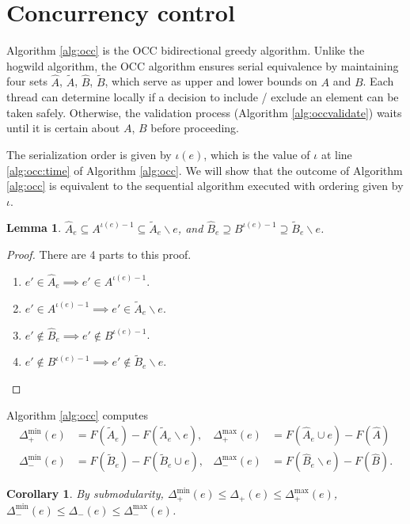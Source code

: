 \documentclass{article} %
\newtheorem{cor}[thm]{Corollary}
\newtheorem{lem}[thm]{Lemma}
\begin{document}
\section{Concurrency control}

Algorithm \ref{alg:occ} is the OCC bidirectional greedy algorithm.
Unlike the hogwild algorithm, the OCC algorithm ensures serial equivalence by maintaining four sets $\hat{A}$, $\tilde{A}$, $\hat{B}$, $\tilde{B}$, which serve as upper and lower bounds on $A$ and $B$.
Each thread can determine locally if a decision to include / exclude an element can be taken safely.
Otherwise, the validation process (Algorithm \ref{alg:occvalidate}) waits until it is certain about $A$, $B$ before proceeding.

The serialization order is given by $\iota(e)$, which is the value of $\iota$ at line \ref{alg:occ:time} of Algorithm \ref{alg:occ}.
We will show that the outcome of Algorithm \ref{alg:occ} is equivalent to the sequential algorithm executed with ordering given by $\iota$.

\begin{lem} $\hat{A}_e \subseteq A^{\iota(e)-1} \subseteq \tilde{A}_e \backslash e$, and $\hat{B}_e \supseteq B^{\iota(e)-1} \supseteq \tilde{B}_e \backslash e$.
\end{lem}
\begin{proof}
There are 4 parts to this proof.
\begin{enumerate}
\item $e' \in \hat{A}_e \implies e' \in A^{\iota(e)-1}$.
\item $e' \in A^{\iota(e)-1} \implies e' \in\tilde{A}_e \backslash e$.
\item $e' \not\in \hat{B}_e \implies e' \not\in B^{\iota(e)-1}$.
\item $e' \not\in B^{\iota(e)-1} \implies e' \not\in\tilde{B}_e \backslash e$.
\end{enumerate}
\end{proof}

Algorithm \ref{alg:occ} computes
\begin{align*}
  \Delta_+^{\min}(e) &= F(\tilde{A}_e) - F(\tilde{A}_e \backslash e),
& \Delta_+^{\max}(e) &= F(\hat{A}_e \cup e) - F(\hat{A})\\
  \Delta_-^{\min}(e) &= F(\tilde{B}_e) - F(\tilde{B}_e \cup e),
& \Delta_-^{\max}(e) &= F(\hat{B}_e \backslash e) - F(\hat{B}).
\end{align*}

\begin{cor} By submodularity, $\Delta_+^{\min}(e) \leq \Delta_+(e) \leq \Delta_+^{\max}(e)$, $\Delta_-^{\min}(e) \leq \Delta_-(e) \leq \Delta_-^{\max}(e)$.
\end{cor}
\end{document}
